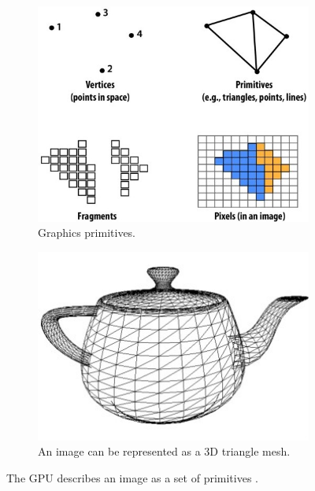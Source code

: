 \documentclass[12pt, twocolumn]{report}
\begin{document}
\begin{figure}[htbp]
    \centering
    \begin{subfigure}{0.45\textwidth}
        \centering
        \includegraphics[width=1\textwidth]{Figures/GPU graphics primitives.jpg}
        \caption{Graphics primitives.}
        \label{GPU graphics primitives}
    \end{subfigure}
    \begin{subfigure}{0.45\textwidth}
        \centering
        \includegraphics[width=1\textwidth]{Figures/GPU graphics triangle mesh.jpg}
        \caption{An image can be represented as a 3D triangle mesh.}
        \label{GPU graphics triangle mesh}
    \end{subfigure}
    \caption{The GPU describes an image as a set of primitives \cite{GPU architecture lecture}.}
    \label{GPU graphics}
\end{figure}
\end{document}

